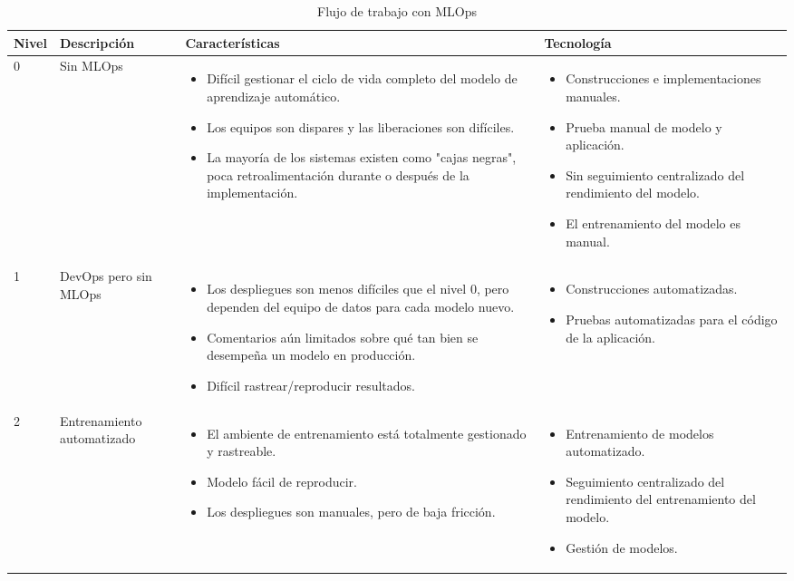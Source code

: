 \begin{longtable}{|p{2cm}|p{3cm}|p{5cm}|p{5cm}|}

\caption{Flujo de trabajo con MLOps}\\
    \hline
    \textbf{Nivel} & \textbf{Descripción} & \textbf{Características} & \textbf{Tecnología} \\
    \hline
    \endhead
        0 & Sin MLOps & \begin{itemize}\item Difícil gestionar el ciclo de vida completo del modelo de aprendizaje automático. \item Los equipos son dispares y las liberaciones son difíciles. \item La mayoría de los sistemas existen como "cajas negras", poca retroalimentación durante o después de la implementación.\end{itemize} & \begin{itemize}\item Construcciones e implementaciones manuales. \item Prueba manual de modelo y aplicación. \item Sin seguimiento centralizado del rendimiento del modelo. \item El entrenamiento del modelo es manual.\end{itemize} \\
        \hline
        1 & DevOps pero sin MLOps & \begin{itemize}\item Los despliegues son menos difíciles que el nivel 0, pero dependen del equipo de datos para cada modelo nuevo. \item Comentarios aún limitados sobre qué tan bien se desempeña un modelo en producción. \item Difícil rastrear/reproducir resultados.\end{itemize} & \begin{itemize}\item Construcciones automatizadas. \item Pruebas automatizadas para el código de la aplicación.\end{itemize} \\
        \hline
        2 & Entrenamiento automatizado & \begin{itemize}\item El ambiente de entrenamiento está totalmente gestionado y rastreable. \item Modelo fácil de reproducir. \item Los despliegues son manuales, pero de baja fricción.\end{itemize} & \begin{itemize}\item Entrenamiento de modelos automatizado. \item Seguimiento centralizado del rendimiento del entrenamiento del modelo. \item Gestión de modelos.\end{itemize} \\

\end{longtable}
